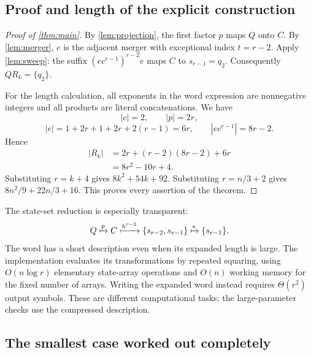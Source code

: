 \documentclass[11pt,a4paper]{article}
\numberwithin{equation}{section}
\theoremstyle{definition}
\theoremstyle{remark}
\begin{document}
\subsection{Proof and length of the explicit construction}

\begin{proof}[Proof of \cref{thm:main}]
By \cref{lem:projection}, the first factor $p$ maps $Q$ onto $C$.
By \cref{lem:merger}, $e$ is the adjacent merger with exceptional index
$t=r-2$. Apply \cref{lem:sweep}: the suffix
$(e c^{r-1})^{r-2}e$ maps $C$ to $s_{r-1}=q_2$. Consequently
$QR_k=\{q_2\}$.

For the length calculation, all exponents in the word expression are
nonnegative integers and all products are literal concatenations. We have
\[
 |c|=2,\qquad |p|=2r,
\]
\[
 |e|=1+2r+1+2r+2(r-1)=6r,
 \qquad |e c^{r-1}|=8r-2.
\]
Hence
\begin{align*}
 |R_k|
 &=2r+(r-2)(8r-2)+6r\\
 &=8r^2-10r+4.
\end{align*}
Substituting $r=k+4$ gives $8k^2+54k+92$. Substituting
$r=n/3+2$ gives $8n^2/9+22n/3+16$. This proves every assertion of the
theorem.
\end{proof}

The state-set reduction is especially transparent:
\[
 Q\xmapsto{p}C
 \xmapsto{h^{r-2}}\{s_{r-2},s_{r-1}\}
 \xmapsto{e}\{s_{r-1}\}.
\]
The word has a short description even when its expanded length is large.
The implementation evaluates its transformations by repeated squaring,
using $O(n\log r)$ elementary state-array operations and $O(n)$ working
memory for the fixed number of arrays. Writing the expanded word instead
requires $\Theta(r^2)$ output symbols. These are different computational
tasks; the large-parameter checks use the compressed description.

\subsection{The smallest case worked out completely}
\end{document}
